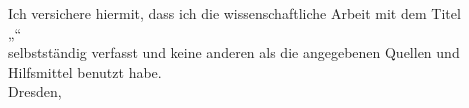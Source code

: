 Ich versichere hiermit, dass ich die wissenschaftliche Arbeit mit dem Titel\bigskip\\
%
„\makeatletter\@title{}\makeatother “\bigskip\\
%
selbstständig verfasst und keine anderen als die angegebenen Quellen und Hilfsmittel benutzt habe.\bigskip\\
%
Dresden, \makeatletter\@date\makeatother\\[2cm]
\makeatletter\@author\makeatother
